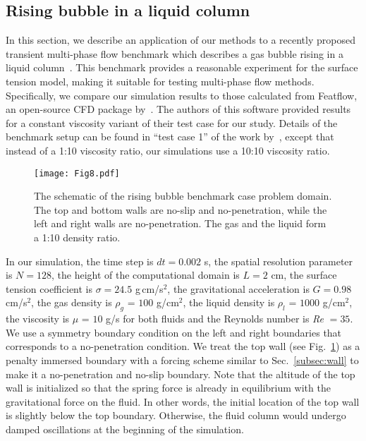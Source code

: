 \documentclass[%
 aip,
 amsmath,amssymb,
 reprint,
 floatfix
]{revtex4-1}
\begin{document}
\subsection {Rising bubble in a liquid column} \label{subsec:rb}
In this section, we describe an application of our methods to a recently proposed transient multi-phase flow benchmark which describes a gas bubble rising in a liquid column~\cite{turek2021numerical}. This benchmark provides a reasonable experiment for the surface tension model, making it suitable for testing multi-phase flow methods. Specifically, we compare our simulation results to those calculated from Featflow, an open-source CFD package by~\citet{turek2021numerical}. The authors of this software provided results for a constant viscosity variant of their test case for our study. Details of the benchmark setup can be found in ``test case 1'' of the work by~\citet{turek2021numerical}, except that instead of a 1:10 viscosity ratio, our simulations use a 10:10 viscosity ratio.  

\begin{figure}
\centering
\texttt{[image: Fig8.pdf]}
\caption{\footnotesize{The schematic of the rising bubble benchmark case problem domain. The top and bottom walls are no-slip and no-penetration, while the left and right walls are no-penetration. The gas and the liquid form a 1:10 density ratio.}}
\label{fig:rb_domain}
\end{figure}

In our simulation, the time step is $dt=0.002$ s, the spatial resolution parameter is $N=128$, the height of the computational domain is $L=2$ cm, the surface tension coefficient is $\sigma=24.5$ g\,cm/s$^2$, the gravitational acceleration is $G=0.98$ cm/s$^2$, the gas density is $\rho_g$ = $100$ g/cm$^2$, the liquid density is $\rho_l$ = $1000$ g/cm$^2$, the viscosity is $\mu$ = $10$ g/s for both fluids and the Reynolds number is \mbox{\textit{Re}} $= 35$. We use a symmetry boundary condition on the left and right boundaries that corresponds to a no-penetration condition. We treat the top wall (see Fig.~\ref{fig:rb_domain}) as a penalty immersed boundary with a forcing scheme similar to Sec.~\ref{subsec:wall} to make it a no-penetration and no-slip boundary. Note that the altitude of the top wall is initialized so that the spring force is already in equilibrium with the gravitational force on the fluid. In other words, the initial location of the top wall is slightly below the top boundary. Otherwise, the fluid column would undergo damped oscillations at the beginning of the simulation.
\end{document}
